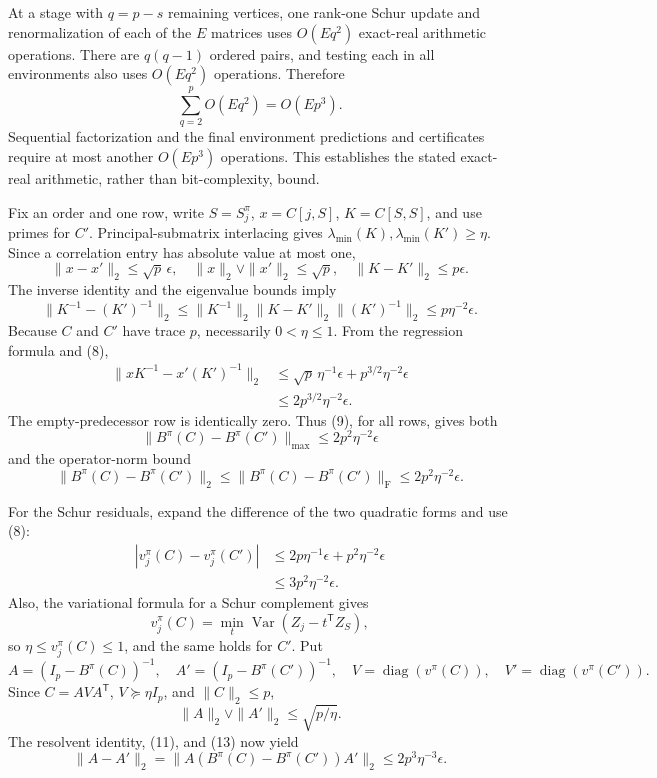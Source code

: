 At a stage with \(q=p-s\) remaining vertices, one rank-one Schur update and renormalization of each of the \(E\) matrices uses \(O(Eq^2)\) exact-real arithmetic operations.  There are \(q(q-1)\) ordered pairs, and testing each in all environments also uses \(O(Eq^2)\) operations.  Therefore
\[
 \sum_{q=2}^{p}O(Eq^2)=O(Ep^3).
\]
Sequential factorization and the final environment predictions and certificates require at most another \(O(Ep^3)\) operations.  This establishes the stated exact-real arithmetic, rather than bit-complexity, bound.

Fix an order and one row, write \(S=S_j^\pi\), \(x=C[j,S]\), \(K=C[S,S]\), and use primes for \(C'\).  Principal-submatrix interlacing gives
\(\lambda_{\min}(K),\lambda_{\min}(K')\ge\eta\).  Since a correlation entry has absolute value at most one,
\[
 \|x-x'\|_2\le\sqrt p\,\epsilon,
 \quad \|x\|_2\vee\|x'\|_2\le\sqrt p,
 \quad \|K-K'\|_2\le p\epsilon.
\]
The inverse identity and the eigenvalue bounds imply
\[
 \|K^{-1}-(K')^{-1}\|_2
 \le\|K^{-1}\|_2\|K-K'\|_2\|(K')^{-1}\|_2
 \le p\eta^{-2}\epsilon. \tag{8}
\]
Because \(C\) and \(C'\) have trace \(p\), necessarily \(0<\eta\le1\).  From the regression formula and (8),
\[
 \begin{aligned}
 \|xK^{-1}-x'(K')^{-1}\|_2
 &\le \sqrt p\,\eta^{-1}\epsilon
       +p^{3/2}\eta^{-2}\epsilon\\
 &\le2p^{3/2}\eta^{-2}\epsilon.
 \end{aligned} \tag{9}
\]
The empty-predecessor row is identically zero.  Thus (9), for all rows, gives both
\[
 \|B^\pi(C)-B^\pi(C')\|_{\max}
 \le2p^2\eta^{-2}\epsilon \tag{10}
\]
and the operator-norm bound
\[
 \|B^\pi(C)-B^\pi(C')\|_2
 \le\|B^\pi(C)-B^\pi(C')\|_{\mathrm F}
 \le2p^2\eta^{-2}\epsilon. \tag{11}
\]

For the Schur residuals, expand the difference of the two quadratic forms and use (8):
\[
 \begin{aligned}
 |v_j^\pi(C)-v_j^\pi(C')|
 &\le 2p\eta^{-1}\epsilon+p^2\eta^{-2}\epsilon\\
 &\le3p^2\eta^{-2}\epsilon. 
 \end{aligned} \tag{12}
\]
Also, the variational formula for a Schur complement gives
\[
 v_j^\pi(C)=\min_t\operatorname{Var}(Z_j-t^{\mathsf T}Z_S),
\]
so \(\eta\le v_j^\pi(C)\le1\), and the same holds for \(C'\).  Put
\[
 A=(I_p-B^\pi(C))^{-1},\quad A'=(I_p-B^\pi(C'))^{-1},
 \quad V=\operatorname{diag}(v^\pi(C)),\quad V'=\operatorname{diag}(v^\pi(C')).
\]
Since \(C=AVA^{\mathsf T}\), \(V\succeq\eta I_p\), and \(\|C\|_2\le p\),
\[
 \|A\|_2\vee\|A'\|_2\le\sqrt{p/\eta}. \tag{13}
\]
The resolvent identity, (11), and (13) now yield
\[
 \|A-A'\|_2
 =\|A(B^\pi(C)-B^\pi(C'))A'\|_2
 \le2p^3\eta^{-3}\epsilon. \tag{14}
\]

